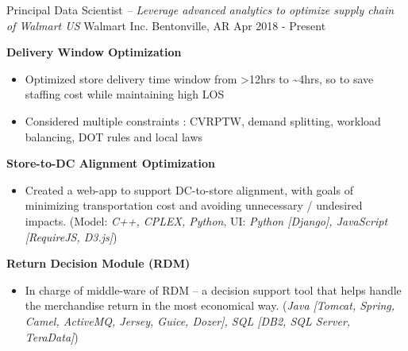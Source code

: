 

\begin{cventries}


\cventry
{Principal Data Scientist \textit{ -- Leverage advanced analytics to optimize supply chain of Walmart US}}          %
{Walmart Inc.}                      %
{Bentonville, AR}                   %
{Apr 2018 - Present}                    %
{
    \begin{cvitems}
    \item {
        \textbf{Delivery Window Optimization}  
        \begin{itemize}
            \item  Optimized store delivery time window from >12hrs to \textasciitilde4hrs, so to save staffing cost while maintaining high LOS
            \item  Considered multiple constraints : CVRPTW, demand splitting, workload balancing, DOT rules and local laws
        \end{itemize}           
    }
    \item {
        \textbf{Store-to-DC Alignment Optimization} 
        \begin{itemize}
            \item  Created a web-app to support DC-to-store alignment, with goals of minimizing transportation cost and avoiding unnecessary / undesired impacts. 
            (Model: \textit{C++, CPLEX, Python}, UI: \textit{Python [Django], JavaScript [RequireJS, D3.js]}) 
        \end{itemize}           
    }
    \item {
        \textbf{Return Decision Module (RDM)} 
        \begin{itemize}
            \item  In charge of middle-ware of RDM -- a decision support tool that helps handle the merchandise return in the most economical way. 
                   (\textit{Java [Tomcat, Spring, Camel, ActiveMQ, Jersey, Guice, Dozer], SQL [DB2, SQL Server, TeraData]})
        \end{itemize}           
    }
    \end{cvitems}%
}


\end{cventries}
